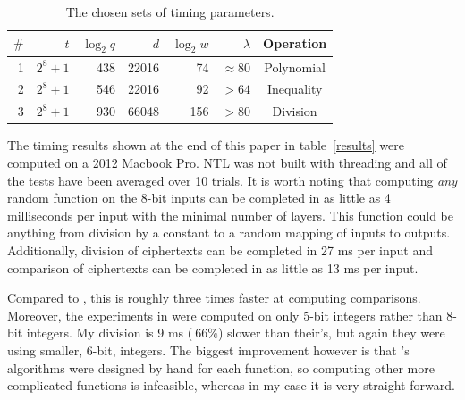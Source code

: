 \documentclass{article}
\begin{document}
        \begin{table}
        \begin{center}
            \begin{tabular}{| r | r | r | r | r | r | c |}%
                \hline
                $\#$& $t$ & $\log_2 q$ & $d$ & $\log_2w$ & $\lambda$ & Operation
                \\ \hline
                1 & $2^8 + 1$ & 438 & 22016 & 74 & $\approx 80$ & Polynomial
                \\ \hline
                2 & $2^8 + 1$ & 546 & 22016 & 92 & $>64$ & Inequality
                \\ \hline
                3 & $2^8 + 1$ & 930 & 66048 & 156 & $>80$ & Division
                \\ \hline
            \end{tabular}
        \end{center}
        \caption{The chosen sets of timing parameters.}
        \label{param}
        \end{table}

        The timing results shown at the end of this paper in table~\ref{results} were computed on a 2012 Macbook Pro.
        NTL was not built with threading and
        all of the tests have been averaged over 10 trials.
        It is worth noting that computing \emph{any} random function on the 8-bit inputs can be completed in as little as 4 milliseconds per input with the minimal number of layers.
        This function could be anything from division by a constant to a random mapping of inputs to outputs.
        Additionally, division of ciphertexts can be completed in 27 ms per input and comparison of ciphertexts can be completed in as little as 13 ms per input.

        Compared to \cite{newton}, this is roughly three times faster at computing comparisons.
        Moreover, the experiments in \cite{newton} were computed on only 5-bit integers rather than 8-bit integers.
        My division is 9 ms ($~66\%$) slower than their's, but again they were using smaller, 6-bit, integers.
        The biggest improvement however is that \cite{newton}'s algorithms were designed by hand for each function,
        so computing other more complicated functions is infeasible, whereas in my case it is very straight forward.
\end{document}

